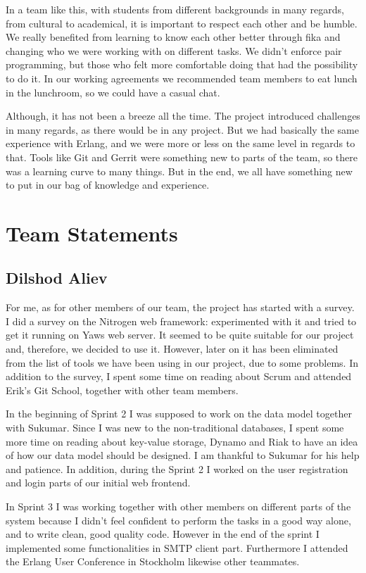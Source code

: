 \documentclass[11pt,a4paper]{report}
\begin{document}
In a team like this, with students from different backgrounds in many regards,
from cultural to academical, it is important to respect each other and be
humble.  We really benefited from learning to know each other better through
fika and changing who we were working with on different tasks. We didn't enforce
pair programming, but those who felt more comfortable doing that had the
possibility to do it. In our working agreements we recommended team members to
eat lunch in the lunchroom, so we could have a casual chat.

Although, it has not been a breeze all the time. The project introduced
challenges in many regards, as there would be in any project. But we had
basically the same experience with Erlang, and we were more or less on the same
level in regards to that. Tools like Git and Gerrit were something new to parts
of the team, so there was a learning curve to many things. But in the end, we
all have something new to put in our bag of knowledge and experience.

\appendix

\chapter{Team Statements}

\section{Dilshod Aliev}
For me, as for other members of our team, the project has started with a survey.
I did a survey on the Nitrogen web framework: experimented with it and tried to
get it running on Yaws web server. It seemed to be quite suitable for our
project and, therefore, we decided to use it. However, later on it has been
eliminated from the list of tools we have been using in our project, due to some
problems. In addition to the survey, I spent some time on reading about Scrum
and attended Erik's Git School, together with other team members.

In the beginning of Sprint 2 I was supposed to work on the data model together
with Sukumar. Since I was new to the non-traditional databases, I spent some
more time on reading about key-value storage, Dynamo and Riak to have an idea of
how our data model should be designed. I am thankful to Sukumar for his help
and patience. In addition, during the Sprint 2 I worked on the user registration
and login parts of our initial web frontend.

In Sprint 3 I was working together with other members on different parts of the
system because I didn't feel confident to perform the tasks in a good way alone,
and to write clean, good quality code. However in the end of the sprint I
implemented some functionalities in SMTP client part. Furthermore I attended the
Erlang User Conference in Stockholm likewise other teammates.
\end{document}
